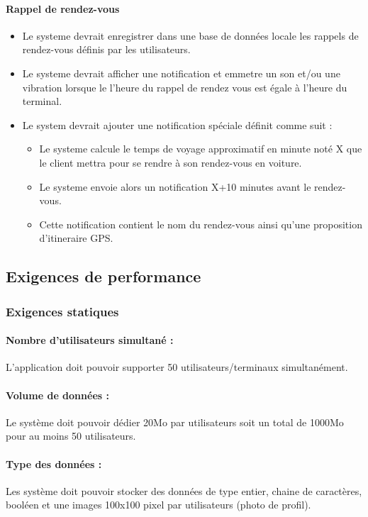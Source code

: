 \documentclass{article}
\begin{document}
\paragraph{Rappel de rendez-vous}
\begin{itemize}
\item Le systeme devrait enregistrer dans une base de données locale les
  rappels de rendez-vous définis par les utilisateurs.
\item Le systeme devrait afficher une notification et emmetre un son
  et/ou une vibration lorsque le l'heure du rappel de rendez vous est
  égale à l'heure du terminal.
\item Le system devrait ajouter une notification spéciale définit
  comme suit :
  \begin{itemize}
    \item Le systeme calcule le temps de voyage approximatif en minute
      noté X que le
      client mettra pour se rendre à son rendez-vous en voiture.
     \item Le systeme envoie alors un notification X+10 minutes avant
       le rendez-vous.
     \item Cette notification contient le nom du rendez-vous ainsi
       qu'une proposition d'itineraire GPS.
  \end{itemize}

\end{itemize}

\subsection{Exigences de performance}
\subsubsection{Exigences statiques}
\paragraph{Nombre d'utilisateurs simultané :}
L'application doit pouvoir supporter 50 utilisateurs/terminaux
simultanément.
\paragraph{Volume de données :}
Le système doit pouvoir dédier 20Mo par utilisateurs soit un total de
1000Mo pour au moins 50 utilisateurs.
\paragraph{Type des données :}
Les système doit pouvoir stocker des données de type entier, chaine de
caractères, booléen et une images 100x100 pixel par utilisateurs
(photo de profil).
\end{document}
